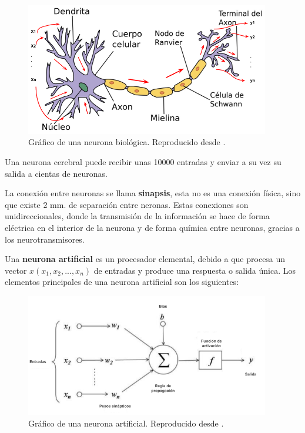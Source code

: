  \begin{figure}[h!]
  \begin{center}	\includegraphics[width=0.95\textwidth, frame]{imagenes/Cap4/neurona}
  \caption{Gr\'{a}fico de una neurona biol\'{o}gica. Reproducido desde \protect\cite{Reference67}.}
  \label{fig:neurona}
  \end{center}
\end{figure}

Una neurona cerebral puede recibir unas 10000 entradas y enviar a su vez su salida a cientas de neuronas.

\vspace{5mm} %

La conexi\'{o}n entre neuronas se llama \textbf{sinapsis}, esta no es una conexi\'{o}n f\'{i}sica, sino que existe 2 mm. de separaci\'{o}n entre neronas. Estas conexiones son unidireccionales, donde la transmisi\'{o}n de la informaci\'{o}n se hace de forma el\'{e}ctrica en el interior de la neurona  y de forma qu\'{i}mica entre neuronas, gracias a los neurotransmisores.

\vspace{5mm} %

Una \textbf{neurona artificial} es un procesador elemental, debido a que procesa un vector $x(x_{1},x_{2}, ... ,x_{n})$ de entradas y produce una respuesta o salida \'{u}nica. Los elementos principales de una neurona artificial son los siguientes:

\begin{figure}[h!]
  \begin{center}	\includegraphics[width=0.95\textwidth, frame]{imagenes/Cap4/neurona_artificial}
  \caption{Gr\'{a}fico de una neurona artificial. Reproducido desde \protect\cite{Reference68}.}
  \label{fig:neurona}
  \end{center}
\end{figure}

